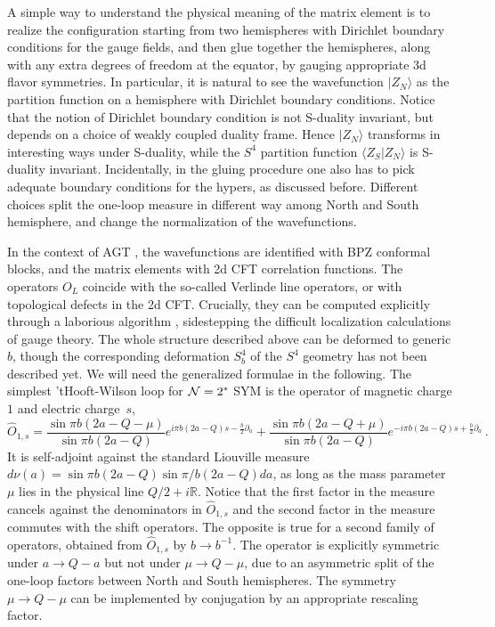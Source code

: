 \documentclass[11pt,letterpaper]{article}
\numberwithin{equation}{section}
\newcommand{\R}{{\mathbb R}}
\begin{document}
A simple way to understand the physical meaning of the matrix element is to realize the configuration starting from
two hemispheres with Dirichlet boundary conditions for the gauge fields, and then glue together the hemispheres, along with any
extra degrees of freedom at the equator, by gauging appropriate 3d flavor symmetries. In particular,
it is natural to see the wavefunction $|Z_N\rangle$ as the partition function on a hemisphere with Dirichlet boundary conditions.
Notice that the notion of Dirichlet boundary condition is not S-duality invariant, but depends on a choice of weakly coupled duality frame.
Hence $| Z_N\rangle$ transforms in interesting ways under S-duality, while the $S^4$ partition function
$\langle Z_S| Z_N \rangle$ is S-duality invariant. Incidentally, in the gluing procedure one also has to
pick adequate boundary conditions for the hypers, as discussed before. Different choices split the one-loop measure in different way
among North and South hemisphere, and change the normalization of the wavefunctions.

In the context of AGT \cite{AGT}, the wavefunctions are identified with BPZ conformal blocks, and the matrix elements
with 2d CFT correlation functions. The operators $O_L$ coincide with the so-called Verlinde line operators, or with
topological defects in the 2d CFT. Crucially, they can be computed explicitly through a laborious algorithm \cite{AGGTV,DGOT},
sidestepping the difficult localization calculations of gauge theory. The whole structure described above
can be deformed to generic $b$, though the corresponding deformation $S^4_b$ of the $S^4$ geometry has not been described yet.
We will need the generalized formulae in the following.
The simplest 'tHooft-Wilson loop for ${\cal N}=2^*$ SYM is the operator of magnetic charge $1$ and electric charge~$s$,
\begin{equation}
\hat O_{1,s} = \frac{\sin \pi b(2 a - Q -\mu)}{\sin \pi b(2a-Q)}e^{i \pi b (2a-Q) s - \frac{b}{2}\partial_a} + \frac{\sin \pi b(2 a - Q + \mu)}{\sin \pi b(2a-Q)}e^{-i \pi b (2a-Q) s + \frac{b}{2}\partial_a}\,.
\end{equation}
It is self-adjoint against the standard Liouville measure $d\nu(a) = \sin \pi b (2 a-Q) \sin \pi/b (2a-Q) da$, as long as the mass parameter $\mu$ lies in the physical line $Q/2+ i \R$.
Notice that the first factor in the measure cancels against the denominators in $\hat O_{1,s}$ and the second factor in the measure commutes with the shift operators.
The opposite is true for a second family of operators, obtained from $\hat O_{1,s}$ by $b \to b^{-1}$. The operator is explicitly symmetric under $a \to Q-a$ but not under
$\mu \to Q-\mu$, due to an asymmetric split of the one-loop factors between North and South hemispheres. The symmetry $\mu \to Q-\mu$
can be implemented by conjugation by an appropriate rescaling factor.
\end{document}
